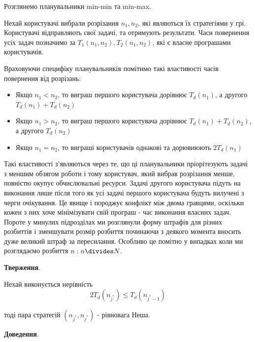 Розглянемо планувальники min-min та min-max.

Нехай користувачі вибрали розрізання $n_1,n_2$, які являються їх стратегіями у грі. Користувачі відправляють свої задачі, та отримують результати. Часи повернення усіх задач позначимо за $T_1(n_1,n_2),T_2(n_1,n_2)$, які є власне програшами користувачів.

Враховуючи специфіку планувальників помітимо такі властивості часів повернення від розрізань:
\begin{itemize}
	\item Якщо $n_1 < n_2$, то виграш першого користувача дорівнює $T_d(n_1)$, а другого $T_d(n_1) + T_d(n_2)$
	\item Якщо $n_1 > n_2$, то виграш першого користувача дорівнює $T_d(n_1) + T_d(n_2)$, а другого $T_d(n_2)$
	\item Якщо $n_1 = n_2$, то виграші користувачів однакові та дорювнюють $2T_d(n_1)$
\end{itemize}

Такі властивості з'являються через те, що ці планувальники пріорітезують задачі з меншим обзягом роботи і тому користувач, який вибрав розрізання менше, повністю окупує обчислювальні ресурси. Задачі другого користувача підуть на виконання лише після того як усі задачі першого користувача будуть вилучені з черги очікування. Це явище і породжує конфлікт між двома гравцями, оскільки кожен з них хоче мінімізувати свій програш - час виконання власних задач. Пороте у минулих підрозділах ми розглянули форму штрафів для різних розбиттів і зменшувати розмір розбиття починаючи з деякого момента вносить дуже великий штраф за пересилання. Особливо це помітно у випадках коли ми розглядаємо розбиття $n: n \divides N$.

\textbf{Тверження}.

Нехай виконується нерівність
\begin{equation}
	2T_d(n_{j^*}) \le T_d(n_{{j^*}-1})
	\label{eq:le_min_both}
\end{equation}

тоді пара стратегій $(n_{j^*},n_{j^*})$ - рівновага Неша.

\textbf{Доведення}.

